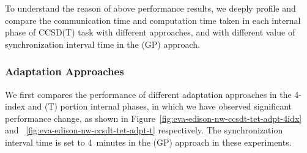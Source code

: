 To understand the reason of above performance results, we deeply profile
and compare the communication time and computation time taken in each
internal phase of CCSD(T) task with different approaches, and with
different value of synchronization interval time in the \libname(GP)
approach.

\subsubsection{Adaptation Approaches}
We first compares the performance of different adaptation approaches
in the 4-index and (T) portion internal phases, in which we have observed
significant performance change, as shown in
Figure~\ref{fig:eva-edison-nw-ccsdt-tet-adpt-4idx} and
~\ref{fig:eva-edison-nw-ccsdt-tet-adpt-t} respectively.
The synchronization interval time is set to 4~minutes in the \libname(GP)
approach in these experiments.

